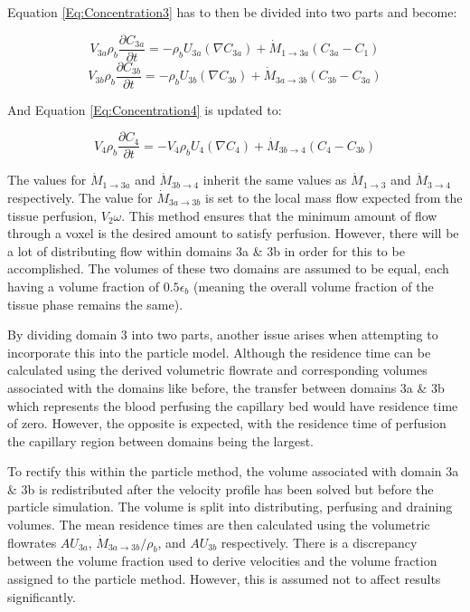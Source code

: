\documentclass[11pt,english,a4paper,twoside,openright]{report}
\begin{document}
{{{{{{{Equation \ref{Eq:Concentration3} has to then be divided into two parts and become:

\begin{equation}
\label{Eq:Concentration3a}
V_{3a}\rho_{b}\frac{\partial C_{3a}}{\partial t}=-\rho_{b}U_{3a}(\nabla C_{3a})+\dot{M}_{1\rightarrow3a}(C_{3a}-C_{1})
\end{equation}
\begin{equation}
\label{Eq:Concentration3b}
V_{3b}\rho_{b}\frac{\partial C_{3b}}{\partial t}=-\rho_{b}U_{3b}(\nabla C_{3b})+\dot{M}_{3a\rightarrow3b}(C_{3b}-C_{3a})
\end{equation}

And Equation \ref{Eq:Concentration4} is updated to:

\begin{equation}
\label{Eq:Concentration4a}
V_{4}\rho_{b}\frac{\partial C_{4}}{\partial t}=-V_{4}\rho_{b}U_{4}(\nabla C_{4})+\dot{M}_{3b\rightarrow4}(C_{4}-C_{3b})
\end{equation}

The values for $\dot{M}_{1\rightarrow3a}$ and $\dot{M}_{3b\rightarrow4}$ inherit the same values as $\dot{M}_{1\rightarrow3}$ and $\dot{M}_{3\rightarrow4}$ respectively. The value for $\dot{M}_{3a\rightarrow3b}$ is set to the local mass flow expected from the tissue perfusion, $V_{2}\omega$. This method ensures that the minimum amount of flow through a voxel is the desired amount to satisfy perfusion. However, there will be a lot of distributing flow within domains 3a \& 3b in order for this to be accomplished. The volumes of these two domains are assumed to be equal, each having a volume fraction of $0.5\epsilon_{b}$ (meaning the overall volume fraction of the tissue phase remains the same).

By dividing domain 3 into two parts, another issue arises when attempting to incorporate this into the particle model. Although the residence time can be calculated using the derived volumetric flowrate and corresponding volumes associated with the domains like before, the transfer between domains 3a \& 3b which represents the blood perfusing the capillary bed would have residence time of zero. However, the opposite is expected, with the residence time of perfusion the capillary region between domains being the largest. 

To rectify this within the particle method, the volume associated with domain 3a \& 3b is redistributed after the velocity profile has been solved but before the particle simulation. The volume is split into distributing, perfusing and draining volumes. The mean residence times are then calculated using the volumetric flowrates $AU_{3a}$, $\dot{M}_{3a\rightarrow3b}/\rho_{b}$, and $AU_{3b}$ respectively. There is a discrepancy between the volume fraction used to derive velocities and the volume fraction assigned to the particle method. However, this is assumed not to affect results significantly.

}}}}}}}
\end{document}
